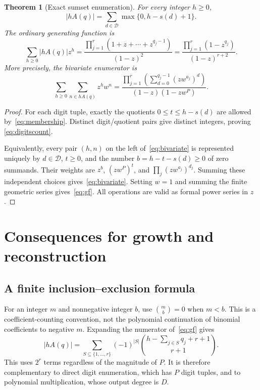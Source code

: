 \documentclass[11pt]{article}
\numberwithin{equation}{section}
\newtheorem{theorem}{Theorem}[section]
\theoremstyle{definition}
\theoremstyle{remark}\newtheorem{remark}[theorem]{Remark}
\begin{document}
\begin{theorem}[Exact sumset enumeration]\label{thm:sumsets}
For every integer $h\ge0$,
\begin{equation}\label{eq:digitscount}
 |hA(q)|=\sum_{d\in\mathcal D}\max\{0,h-s(d)+1\}.
\end{equation}
The ordinary generating function is
\begin{equation}\label{eq:gf}
 \boxed{\ \sum_{h\ge0}|hA(q)|z^h
 =\frac{\displaystyle\prod_{j=1}^r(1+z+\cdots+z^{q_j-1})}{(1-z)^2}
 =\frac{\displaystyle\prod_{j=1}^r(1-z^{q_j})}{(1-z)^{r+2}}.\ }
\end{equation}
More precisely, the bivariate enumerator is
\begin{equation}\label{eq:bivariate}
 \sum_{h\ge0}\sum_{n\in hA(q)}z^h w^n
 =\frac{\displaystyle\prod_{j=1}^r
       \left(\sum_{d=0}^{q_j-1}(zw^{a_j})^d\right)}
       {(1-z)(1-zw^P)}.
\end{equation}
\end{theorem}
\begin{proof}
For each digit tuple, exactly the quotients
$0\le t\le h-s(d)$ are allowed by~\eqref{eq:membership}.
Distinct digit/quotient pairs give distinct integers, proving
\eqref{eq:digitscount}.

Equivalently, every pair $(h,n)$ on the left of~\eqref{eq:bivariate}
is represented uniquely by $d\in\mathcal D$, $t\ge0$, and the number
$b=h-t-s(d)\ge0$ of zero summands.  Their weights are
$z^b$, $(zw^P)^t$, and $\prod_j(zw^{a_j})^{d_j}$.
Summing these independent choices gives~\eqref{eq:bivariate}.
Setting $w=1$ and summing the finite geometric series gives~\eqref{eq:gf}.
All operations are valid as formal power series in $z$.
\end{proof}

\section{Consequences for growth and reconstruction}

\subsection{A finite inclusion--exclusion formula}

For an integer $m$ and nonnegative integer $b$, use
$\binom{m}{b}=0$ when $m<b$.  This is a coefficient-counting convention,
not the polynomial continuation of binomial coefficients to negative $m$.
Expanding the numerator of~\eqref{eq:gf} gives
\begin{equation}\label{eq:inclusion}
 |hA(q)|=\sum_{S\subseteq\{1,\ldots,r\}}(-1)^{|S|}
 \binom{h-\sum_{j\in S}q_j+r+1}{r+1}.
\end{equation}
This uses $2^r$ terms regardless of the magnitude of $P$.
It is therefore complementary to direct digit enumeration, which has $P$
digit tuples, and to polynomial multiplication, whose output degree is $D$.
\end{document}

